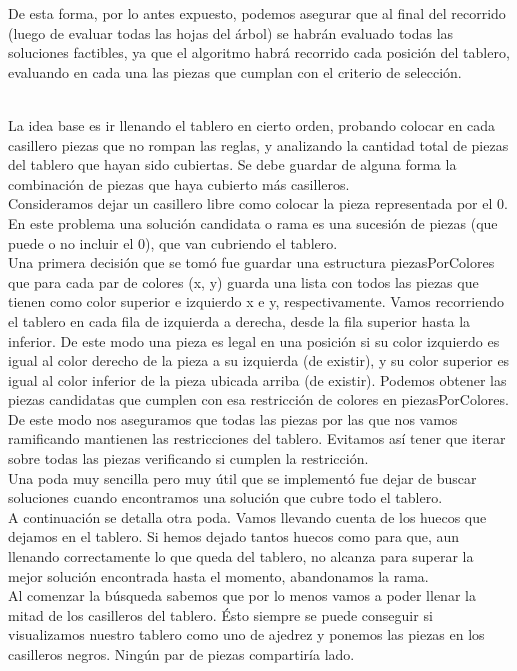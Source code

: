 \documentclass[11pt, a4paper, twoside]{article}
\begin{document}
De esta forma, por lo antes expuesto, podemos asegurar que al final del recorrido (luego de evaluar todas las hojas del árbol) se habrán evaluado todas las soluciones factibles, ya que el algoritmo habrá recorrido cada posición del tablero, evaluando en cada una las piezas que cumplan con el criterio de selección.

\\

La idea base es ir llenando el tablero en cierto orden, probando colocar en cada
casillero piezas que no rompan las reglas, y analizando la cantidad total de
piezas del tablero que hayan sido cubiertas. Se debe guardar de alguna forma la
combinación de piezas que haya cubierto más casilleros.\\ Consideramos dejar un
casillero libre como colocar la pieza representada por el 0. En este problema
una solución candidata o rama es una sucesión de piezas (que puede o no incluir
el 0), que van cubriendo el tablero.\\ Una primera decisión que se tomó fue
guardar una estructura piezasPorColores que para cada par de colores (x, y)
guarda una lista con todos las piezas que tienen como color superior e izquierdo
x e y, respectivamente. Vamos recorriendo el tablero en cada fila de izquierda a
derecha, desde la fila superior hasta la inferior. De este modo una pieza es
legal en una posición si su color izquierdo es igual al color derecho de la
pieza a su izquierda (de existir), y su color superior es igual al color
inferior de la pieza ubicada arriba (de existir). Podemos obtener las piezas
candidatas que cumplen con esa restricción de colores en piezasPorColores. De
este modo nos aseguramos que todas las piezas por las que nos vamos ramificando
mantienen las restricciones del tablero. Evitamos así tener que iterar sobre
todas las piezas verificando si cumplen la restricción.\\
Una poda muy sencilla pero muy útil que se 
implementó fue dejar de buscar soluciones cuando encontramos una solución que
cubre todo el tablero. \\
A continuación se detalla otra poda. Vamos
llevando cuenta de los huecos que dejamos en el tablero. Si hemos dejado tantos
huecos como para que, aun llenando correctamente lo que queda del tablero, no
alcanza para superar la mejor solución encontrada hasta el momento, abandonamos
la rama.\\

Al comenzar la búsqueda sabemos que por lo menos vamos a
poder llenar la mitad de los casilleros del tablero. Ésto siempre se puede
conseguir si visualizamos nuestro tablero como uno de ajedrez y ponemos las
piezas en los casilleros negros. Ningún par de piezas compartiría lado. 
\end{document}
